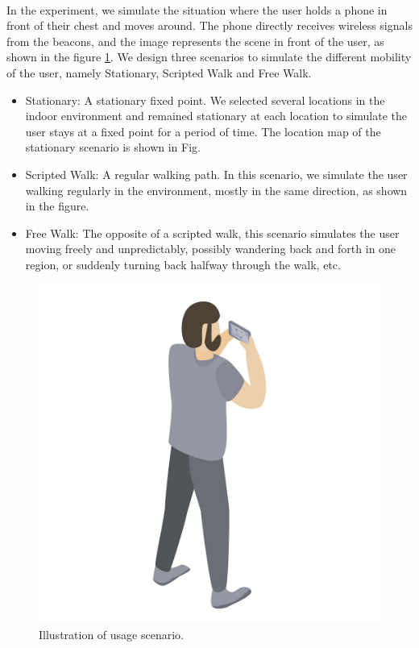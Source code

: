 \documentclass[a4paper,12pt]{report}
\begin{document}
\paragraph{}
In the experiment, we simulate the situation where the user holds a phone in front of their chest and moves around. The phone directly receives wireless signals from the beacons, and the image represents the scene in front of the user, as shown in the figure \ref{Fig:simulate}. We design three scenarios to simulate the different mobility of the user, namely Stationary, Scripted Walk and Free Walk.
\begin{itemize}
    \item Stationary: A stationary fixed point. We selected several locations in the indoor environment and remained stationary at each location to simulate the user stays at a fixed point for a period of time. The location map of the stationary scenario is shown in Fig.
    \item Scripted Walk: A regular walking path. In this scenario, we simulate the user walking regularly in the environment, mostly in the same direction, as shown in the figure.
    \item Free Walk: The opposite of a scripted walk, this scenario simulates the user moving freely and unpredictably, possibly wandering back and forth in one region, or suddenly turning back halfway through the walk, etc.
\end{itemize}
\begin{figure}
    \centering
    \includegraphics[width=0.3\columnwidth]{images/chap4/simulate.png}
    \caption{Illustration of usage scenario.}
    \label{Fig:simulate}
\end{figure}
\end{document}
